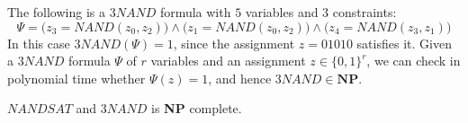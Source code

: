   \begin{example}
  The following is a $3NAND$ formula with $5$ variables and $3$ constraints:
  \[\Psi = \big( z_3 = NAND(z_0, z_2)\big) \wedge \big( z_1 = NAND(z_0, z_2)\big) \wedge \big( z_4 = NAND(z_3, z_1)\big)\]
  In this case $3NAND(\Psi) = 1$, since the assignment $z = 01010$ satisfies it. Given a $3NAND$ formula $\Psi$ of $r$ variables and an assignment $z \in \{0,1\}^r$, we can check in polynomial time whether $\Psi (z) = 1$, and hence $3NAND \in \mathbf{NP}$. 
  \end{example}

  \begin{theorem}
  $NANDSAT$ and $3NAND$ is \textbf{NP} complete. 
  \end{theorem}

